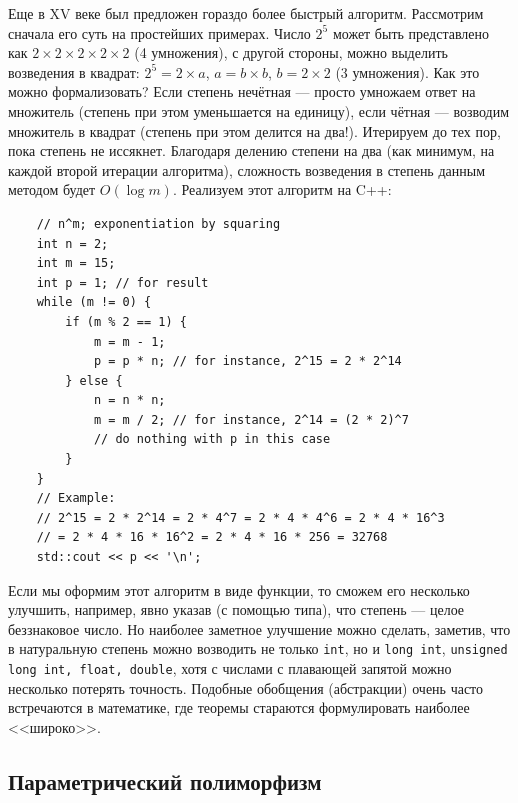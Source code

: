 \documentclass{book}
\begin{document}
Еще в XV веке был предложен гораздо более быстрый алгоритм. Рассмотрим сначала его суть на
простейших примерах. Число $2^5$ может быть представлено как $2 \times 2 \times 2 \times 2 \times
2$ (4 умножения), с другой стороны, можно выделить возведения в квадрат: $2^5 = 2 \times a$, $a = b
\times b$, $b = 2 \times 2$ (3 умножения). Как это можно формализовать? Если степень нечётная --- просто
умножаем ответ на множитель (степень при этом уменьшается на единицу), если чётная --- возводим
множитель в квадрат (степень при этом делится на два!). Итерируем до тех пор,
пока степень не иссякнет. Благодаря делению степени на два (как минимум, на каждой второй итерации
алгоритма), сложность возведения в степень данным методом будет $O(\log m)$. Реализуем этот
алгоритм на C++:
\begin{verbatim}
    // n^m; exponentiation by squaring
    int n = 2;
    int m = 15;
    int p = 1; // for result
    while (m != 0) {
        if (m % 2 == 1) {
            m = m - 1;
            p = p * n; // for instance, 2^15 = 2 * 2^14
        } else {
            n = n * n;
            m = m / 2; // for instance, 2^14 = (2 * 2)^7
            // do nothing with p in this case
        }
    }
    // Example:
    // 2^15 = 2 * 2^14 = 2 * 4^7 = 2 * 4 * 4^6 = 2 * 4 * 16^3
    // = 2 * 4 * 16 * 16^2 = 2 * 4 * 16 * 256 = 32768
    std::cout << p << '\n';
\end{verbatim}

Если мы оформим этот алгоритм в виде функции, то сможем его несколько улучшить, например, явно
указав (с помощью типа), что степень --- целое беззнаковое число. Но наиболее заметное улучшение
можно сделать, заметив, что в натуральную степень можно возводить не только \texttt{int},
но и \texttt{long int}, \texttt{unsigned long int, float, double}, хотя с числами
с плавающей запятой можно несколько потерять точность. Подобные обобщения (абстракции) очень часто
встречаются в математике, где теоремы стараются формулировать наиболее <<широко>>.

\subsection{Параметрический полиморфизм}
\end{document}
